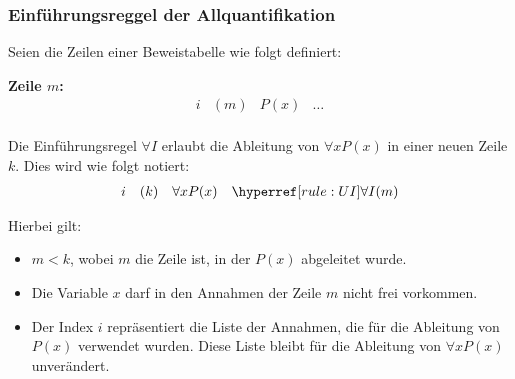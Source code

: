 \documentclass[main.tex]{subfiles}
\begin{document}
\subsubsection{Einführungsreggel der  Allquantifikation}
\label{rule:UI}
\begin{definition}
Seien die Zeilen einer Beweistabelle wie folgt definiert:

\textbf{Zeile \(m\):}
\[
\begin{array}{llll}
    i & (m) & P(x) & \dots \\
\end{array}
\]

Die Einführungsregel \(\forall I\) erlaubt die Ableitung von \(\forall x P(x)\) in einer neuen Zeile \(k\). Dies wird wie folgt notiert:
\[
\begin{array}{llll}
    i & (k) & \forall x P(x) & \rUI{m} \\
\end{array}
\]

Hierbei gilt:
\begin{itemize}
    \item \(m < k\), wobei \(m\) die Zeile ist, in der \(P(x)\) abgeleitet wurde.
    \item Die Variable \(x\) darf in den Annahmen der Zeile \(m\) nicht frei vorkommen.
    \item Der Index \(i\) repräsentiert die Liste der Annahmen, die für die Ableitung von \(P(x)\) verwendet wurden. Diese Liste bleibt für die Ableitung von \(\forall x P(x)\) unverändert.
\end{itemize}
\end{definition}
\end{document}
